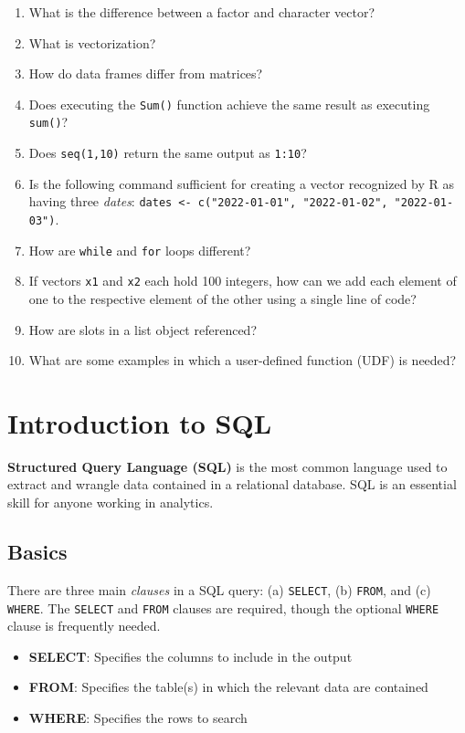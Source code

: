 \documentclass[
]{book}
\providecommand{\tightlist}{%
  \setlength{\itemsep}{0pt}\setlength{\parskip}{0pt}}
\begin{document}
\begin{enumerate}
\def\labelenumi{\arabic{enumi}.}
\item
  What is the difference between a factor and character vector?
\item
  What is vectorization?
\item
  How do data frames differ from matrices?
\item
  Does executing the \texttt{Sum()} function achieve the same result as executing \texttt{sum()}?
\item
  Does \texttt{seq(1,10)} return the same output as \texttt{1:10}?
\item
  Is the following command sufficient for creating a vector recognized by R as having three \emph{dates}: \texttt{dates\ \textless{}-\ c("2022-01-01",\ "2022-01-02",\ "2022-01-03")}.
\item
  How are \texttt{while} and \texttt{for} loops different?
\item
  If vectors \texttt{x1} and \texttt{x2} each hold 100 integers, how can we add each element of one to the respective element of the other using a single line of code?
\item
  How are slots in a list object referenced?
\item
  What are some examples in which a user-defined function (UDF) is needed?
\end{enumerate}

\hypertarget{sql-intro}{%
\chapter{Introduction to SQL}\label{sql-intro}}

\textbf{Structured Query Language (SQL)} is the most common language used to extract and wrangle data contained in a relational database. SQL is an essential skill for anyone working in analytics.

\hypertarget{basics}{%
\section{Basics}\label{basics}}

There are three main \emph{clauses} in a SQL query: (a) \texttt{SELECT}, (b) \texttt{FROM}, and (c) \texttt{WHERE}. The \texttt{SELECT} and \texttt{FROM} clauses are required, though the optional \texttt{WHERE} clause is frequently needed.

\begin{itemize}
\tightlist
\item
  \textbf{SELECT}: Specifies the columns to include in the output
\item
  \textbf{FROM}: Specifies the table(s) in which the relevant data are contained
\item
  \textbf{WHERE}: Specifies the rows to search
\end{itemize}
\end{document}
